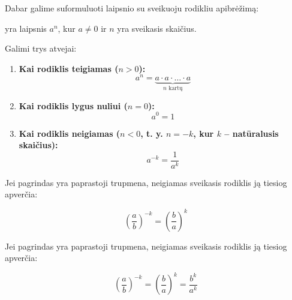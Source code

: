 \documentclass[11pt,a4paper]{scrartcl}
\begin{document}
Dabar galime suformuluoti laipsnio su sveikuoju rodikliu apibrėžimą:
\begin{definition}
    yra laipsnis $a^n$, kur  $a \neq 0$ ir $n$ yra sveikasis skaičius.
\end{definition}
Galimi trys atvejai:
\begin{enumerate}
    \item \textbf{Kai rodiklis teigiamas ($n > 0$):} 
    $$a^n = \underbrace{a \cdot a \cdot \dots \cdot a}_{n \text{ kartų}}$$
    
    \item \textbf{Kai rodiklis lygus nuliui ($n = 0$):} 
    $$a^0 = 1$$
    
    \item \textbf{Kai rodiklis neigiamas ($n < 0$, t. y. $n = -k$, kur $k$ -- natūralusis skaičius):}
    $$a^{-k} = \frac{1}{a^k}$$
\end{enumerate}
\begin{remark}
Jei pagrindas yra paprastoji trupmena, neigiamas sveikasis rodiklis ją tiesiog apverčia:

$$\left(\frac{a}{b}\right)^{-k} = \left(\frac{b}{a}\right)^k $$
\end{remark}

Jei pagrindas yra paprastoji trupmena, neigiamas sveikasis rodiklis ją tiesiog apverčia:

$$\left(\frac{a}{b}\right)^{-k} = \left(\frac{b}{a}\right)^k = \frac{b^k}{a^k}$$
\end{document}
